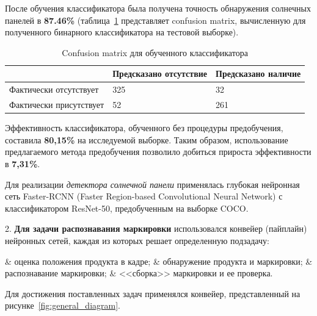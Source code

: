 \documentclass{thesisby}
\begin{document}
После обучения классификатора была получена точность обнаружения солнечных панелей в \textbf{87.46\%} (таблица~\ref{table:solar_detection_cm} представляет confusion matrix, вычисленную для полученного бинарного классификатора на тестовой выборке).

\begin{table}[H]
	\caption{Confusion matrix для обученного классификатора}
	\label{table:solar_detection_cm}
	\centering
	\begin{tabular}{|p{6cm}|p{4cm}|p{4cm}|}
		\hline
		& \textbf{Предсказано отсутствие} & \textbf{Предсказано наличие}\\
		\hline
	    Фактически отсутствует & 325  & 32 \\
	    \hline
		Фактически присутствует & 52 & 261 \\
		\hline
	\end{tabular}			
\end{table}	

Эффективность классификатора, обученного без процедуры предобучения, составила \textbf{80,15\%}  на исследуемой выборке. 
Таким образом, использование предлагаемого метода предобучения позволило добиться прироста эффективности в \textbf{7,31\%}.

Для реализации \textit{детектора солнечной панели} применялась глубокая нейронная сеть Faster-RCNN (Faster Region-based Convolutional Neural Network) с классификатором ResNet-50, предобученным на выборке COCO.

2. \textbf{Для задачи распознавания маркировки} использовался конвейер (пайплайн) нейронных сетей, каждая из которых решает определенную подзадачу:
\begin{easylistNum}
  & оценка положения продукта в кадре;
	& обнаружение продукта и маркировки;
	& распознавание маркировки;
	& <<сборка>> маркировки и ее проверка.
\end{easylistNum}

Для достижения поставленных задач применялся конвейер, представленный на рисунке~\ref{fig:general_diagram}.
 
\end{document}
